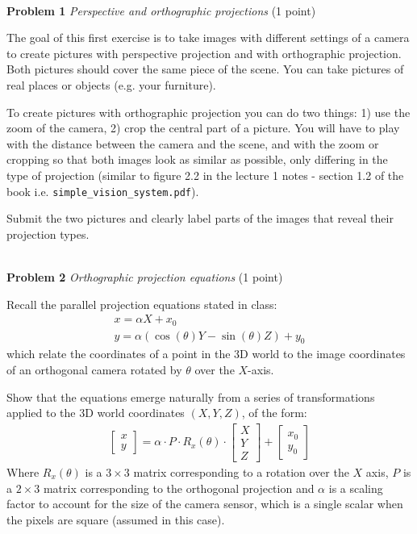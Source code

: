 \documentclass[11pt]{article}
\newcommand{\hwproblem}[2] {\noindent \\ {\bf #1} {\it #2}}
\begin{document}
\hwproblem{Problem 1}{Perspective and orthographic projections} (1 point)

The goal of this first exercise is to take images with different settings of a camera to create pictures with perspective projection and with orthographic projection. Both pictures should cover the same piece of the scene. You can take pictures of real places or objects (e.g. your furniture).%

To create pictures with orthographic projection you can do two things: 1) use the zoom of the camera, 2) crop the central part of a picture. You will have to play with the distance between the camera and the scene, and with the zoom or cropping so that both images look as similar as possible, only differing in the type of projection (similar to figure 2.2 in the lecture 1 notes - section 1.2 of the book i.e. \texttt{simple\_vision\_system.pdf}).

Submit the two pictures and clearly label parts of the images that reveal their projection types.


\hwproblem{Problem 2}{Orthographic projection equations} (1 point)

Recall the parallel projection equations stated in class:
\begin{gather}
    x = \alpha  X + x_0\\
    y = \alpha (\cos(\theta)Y - \sin(\theta)Z) +y_{0}
\end{gather}
which relate the coordinates of a point in the 3D world to the image coordinates of an orthogonal camera rotated by $\theta$ over the $X$-axis.

Show that the  equations emerge naturally from a series of transformations
applied to the 3D world coordinates $(X,Y,Z)$, of the form:
\begin{gather}
\left[
  \begin{array}{c}
    x \\
    y
  \end{array}
\right] = \alpha \cdot P \cdot R_x(\theta) \cdot
\left[
  \begin{array}{ccc}
    X \\
    Y \\
    Z
  \end{array}
\right] +
\left[
  \begin{array}{c}
    x_0 \\
    y_0
  \end{array}
\right]
\end{gather}
Where $R_x(\theta)$ is a $3\times 3$ matrix corresponding to a rotation over the $X$ axis, $P$ is a $2 \times 3$ matrix corresponding to the orthogonal projection and $\alpha$ is  a scaling factor to account for the size
of the
camera sensor, which is a single scalar when the pixels are square (assumed in this case).  
\end{document}
